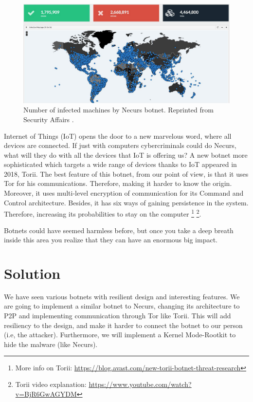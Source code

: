 \documentclass[11pt, a4paper,twoside]{tesi_upf}
\begin{document}
\begin{figure}
    \centering
    \includegraphics[width=\linewidth]{images/necurs-size.png}
    \caption{Number of infected machines by Necurs botnet. Reprinted from Security Affairs \cite{necurs-size}.}
    \label{fig:necurs-size}
\end{figure}

Internet of Things (IoT) opens the door to a new marvelous word, where all devices are connected. If just with computers cybercriminals could do Necurs, what will they do with all the devices that IoT is offering us? A new botnet more sophisticated which targets a wide range of devices thanks to IoT appeared in 2018, Torii. The best feature of this botnet, from our point of view, is that it uses Tor for his communications. Therefore, making it harder to know the origin. Moreover, it uses multi-level encryption of communication for its Command and Control architecture. Besides, it has six ways of gaining persistence in the system. Therefore, increasing its probabilities to stay on the computer \footnote{More info on Torii: \url{https://blog.avast.com/new-torii-botnet-threat-research}} \footnote{Torii video explanation: \url{https://www.youtube.com/watch?v=BjR6GwAGYDM}}.

Botnets could have seemed harmless before, but once you take a deep breath inside this area you realize that they can have an enormous big impact.

\chapter{Solution}
\label{solution}

We have seen various botnets with resilient design and interesting features. We are going to implement a similar botnet to Necurs, changing its architecture to P2P and implementing communication through Tor like Torii. This will add resiliency to the design, and make it harder to connect the botnet to our person (i.e, the attacker). Furthermore, we will implement a Kernel Mode-Rootkit to hide the malware (like Necurs).
\end{document}
